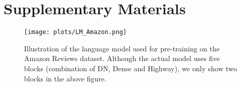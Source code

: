 \documentclass{article}
\begin{document}



\clearpage

\section*{Supplementary Materials}
\begin{figure}[!htb]
    \centering
    \texttt{[image: plots/LM\_Amazon.png]}
    \caption{Illustration of the language model used for pre-training on the Amazon Reviews dataset. Although the actual model uses five blocks (combination of DN, Dense and Highway), we only show two blocks in the above figure.}
    \label{fig:amazon_pre-training}
\end{figure}
\end{document}
